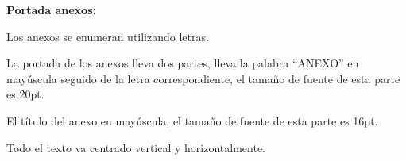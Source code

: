 {{\begin{lista}
    \item\textbf{Portada anexos:}
    \begin{lista}
        \item Los anexos se enumeran utilizando letras.
        \item La portada de los anexos lleva dos partes, lleva la palabra “ANEXO” en mayúscula seguido de la letra correspondiente, el tamaño de fuente de esta parte es 20pt.
        \item El título del anexo en mayúscula, el tamaño de fuente de esta parte es 16pt.
        \item Todo el texto va centrado vertical y horizontalmente.
    \end{lista}

    \end{lista}
    }
}


\newenvironment{conclusiones}{En esta sección se escriben las conclusiones a las que se ha llegado luego de realizar el trabajo, las conclusiones deben concordar con los objetivos planteados anteriormente.}{}

\newenvironment{recomendaciones}{
En esta sección, se presentan las recomendaciones hechas por el grupo de trabajo para las personas que se beneficiarán del estudio o proyecto realizado.
}{}


\newcommand{\mostrarglosario}{true}
\itemglosario{}{}
\itemglosario{}{}



